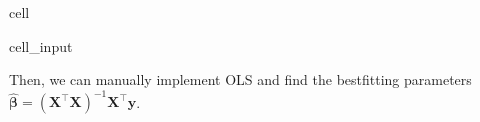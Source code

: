 \documentclass[letterpaper,10pt,english]{jupyterBook}
\begin{document}
\begin{sphinxuseclass}{cell}\begin{sphinxVerbatimInput}

\begin{sphinxuseclass}{cell_input}
\begin{sphinxVerbatim}[commandchars=\\\{\}]
  \PYG{p}{[}   \PYG{p}{]}
\end{sphinxVerbatim}

\end{sphinxuseclass}\end{sphinxVerbatimInput}

\end{sphinxuseclass}
\sphinxAtStartPar
Then, we can manually implement OLS and find the best\sphinxhyphen{}fitting parameters \(\widehat{\boldsymbol{\beta}} = (\mathbf{X}^\top \mathbf{X})^{-1}\mathbf{X}^\top \mathbf{y}\).
\end{document}
